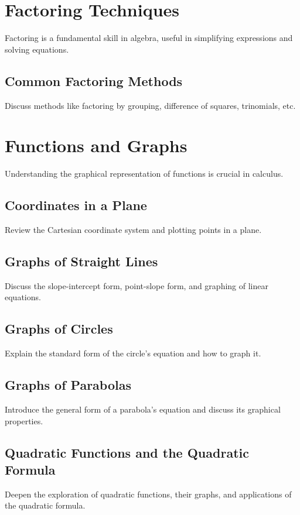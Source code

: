 \documentclass[a4paper,12pt]{book}
\begin{document}
\section{Factoring Techniques}
\label{sec:factoring_techniques}
Factoring is a fundamental skill in algebra, useful in simplifying expressions and solving equations.


\subsection{Common Factoring Methods}
\label{subsec:common_factoring_methods}
Discuss methods like factoring by grouping, difference of squares, trinomials, etc.


\section{Functions and Graphs}
\label{sec:functions_and_graphs}
Understanding the graphical representation of functions is crucial in calculus.


\subsection{Coordinates in a Plane}
\label{subsec:coordinates_in_a_plane}
Review the Cartesian coordinate system and plotting points in a plane.


\subsection{Graphs of Straight Lines}
\label{subsec:graphs_of_straight_lines}
Discuss the slope-intercept form, point-slope form, and graphing of linear equations.


\subsection{Graphs of Circles}
\label{subsec:graphs_of_circles}
Explain the standard form of the circle's equation and how to graph it.


\subsection{Graphs of Parabolas}
\label{subsec:graphs_of_parabolas}
Introduce the general form of a parabola's equation and discuss its graphical properties.


\subsection{Quadratic Functions and the Quadratic Formula}
\label{subsec:quadratic_functions_formula}
Deepen the exploration of quadratic functions, their graphs, and applications of the quadratic formula.
\end{document}
